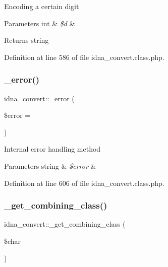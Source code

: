 Encoding a certain digit 
\begin{DoxyParams}[1]{Parameters}
int & {\em \$d} & \\
\hline
\end{DoxyParams}
\begin{DoxyReturn}{Returns}
string 
\end{DoxyReturn}


Definition at line 586 of file idna\+\_\+convert.\+class.\+php.

\hypertarget{classidna__convert_a1a9abb3bcbd4425a4b1c013f50ab757b}{}\label{classidna__convert_a1a9abb3bcbd4425a4b1c013f50ab757b} 
\subsubsection{\texorpdfstring{\+\_\+error()}{\_error()}}
{\footnotesize\ttfamily idna\+\_\+convert\+::\+\_\+error (\begin{DoxyParamCaption}\item[{}]{\$error = {\ttfamily \textquotesingle{}\textquotesingle{}} }\end{DoxyParamCaption})\hspace{0.3cm}{\ttfamily [protected]}}

Internal error handling method 
\begin{DoxyParams}[1]{Parameters}
string & {\em \$error} & \\
\hline
\end{DoxyParams}


Definition at line 606 of file idna\+\_\+convert.\+class.\+php.

\hypertarget{classidna__convert_abd868ffb75c0d7633998ab14f6621dd3}{}\label{classidna__convert_abd868ffb75c0d7633998ab14f6621dd3} 
\subsubsection{\texorpdfstring{\+\_\+get\+\_\+combining\+\_\+class()}{\_get\_combining\_class()}}
{\footnotesize\ttfamily idna\+\_\+convert\+::\+\_\+get\+\_\+combining\+\_\+class (\begin{DoxyParamCaption}\item[{}]{\$char }\end{DoxyParamCaption})\hspace{0.3cm}{\ttfamily [protected]}}


